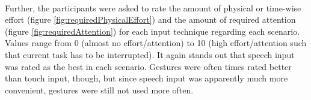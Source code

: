 \begin{figure}[h]
	\myfloatalign
	 \\
	\caption{}
	\label{fig:controlAndUsage}
\end{figure}

\newpage

Further, the participants were asked to rate the amount of physical or time-wise effort (figure \ref{fig:requiredPhysicalEffort}) and the amount of required attention (figure \ref{fig:requiredAttention}) for each input technique regarding each scenario. Values range from 0 (almost no effort/attention) to 10 (high effort/attention such that current task has to be interrupted). It again stands out that speech input was rated as the best in each scenario. Gestures were often times rated better than touch input, though, but since speech input was apparently much more convenient, gestures were still not used more often.

